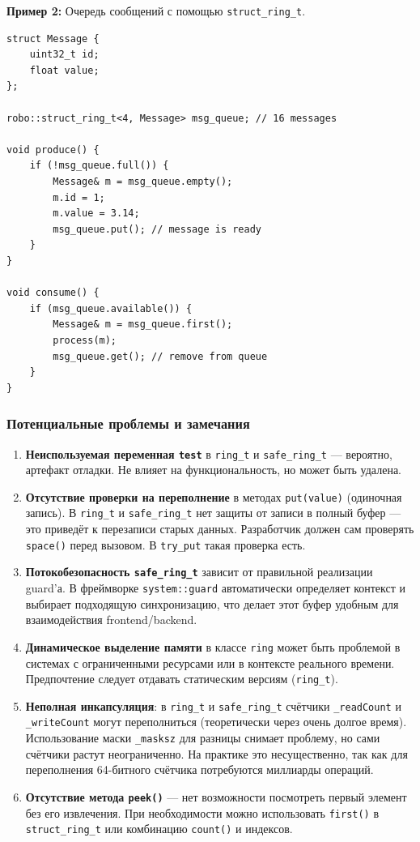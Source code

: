 \documentclass[a4paper,12pt]{article}
\begin{document}
\textbf{Пример 2:} Очередь сообщений с помощью \texttt{struct\_ring\_t}.

\begin{lstlisting}[caption={Message queue using struct\_ring\_t}]
struct Message {
    uint32_t id;
    float value;
};

robo::struct_ring_t<4, Message> msg_queue; // 16 messages

void produce() {
    if (!msg_queue.full()) {
        Message& m = msg_queue.empty();
        m.id = 1;
        m.value = 3.14;
        msg_queue.put(); // message is ready
    }
}

void consume() {
    if (msg_queue.available()) {
        Message& m = msg_queue.first();
        process(m);
        msg_queue.get(); // remove from queue
    }
}
\end{lstlisting}

\subsubsection{Потенциальные проблемы и замечания}

\begin{enumerate}
    \item \textbf{Неиспользуемая переменная \texttt{test}} в \texttt{ring\_t} и \texttt{safe\_ring\_t} — вероятно, артефакт отладки. Не влияет на функциональность, но может быть удалена.
    \item \textbf{Отсутствие проверки на переполнение} в методах \texttt{put(value)} (одиночная запись). В \texttt{ring\_t} и \texttt{safe\_ring\_t} нет защиты от записи в полный буфер — это приведёт к перезаписи старых данных. Разработчик должен сам проверять \texttt{space()} перед вызовом. В \texttt{try\_put} такая проверка есть.
    \item \textbf{Потокобезопасность \texttt{safe\_ring\_t}} зависит от правильной реализации guard'а. В фреймворке \texttt{system::guard} автоматически определяет контекст и выбирает подходящую синхронизацию, что делает этот буфер удобным для взаимодействия frontend/backend.
    \item \textbf{Динамическое выделение памяти} в классе \texttt{ring} может быть проблемой в системах с ограниченными ресурсами или в контексте реального времени. Предпочтение следует отдавать статическим версиям (\texttt{ring\_t}).
    \item \textbf{Неполная инкапсуляция}: в \texttt{ring\_t} и \texttt{safe\_ring\_t} счётчики \texttt{\_readCount} и \texttt{\_writeCount} могут переполниться (теоретически через очень долгое время). Использование маски \texttt{\_masksz} для разницы снимает проблему, но сами счётчики растут неограниченно. На практике это несущественно, так как для переполнения 64-битного счётчика потребуются миллиарды операций.
    \item \textbf{Отсутствие метода \texttt{peek()}} — нет возможности посмотреть первый элемент без его извлечения. При необходимости можно использовать \texttt{first()} в \texttt{struct\_ring\_t} или комбинацию \texttt{count()} и индексов.
\end{enumerate}
\end{document}
